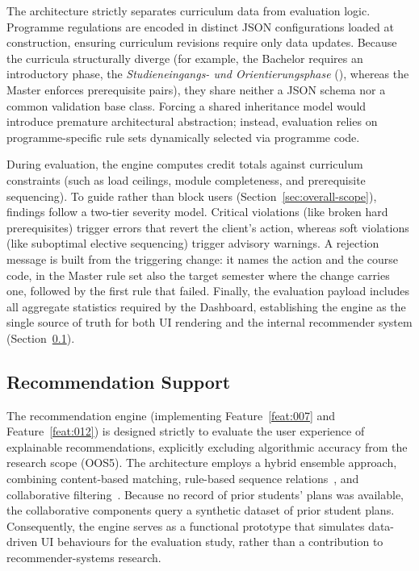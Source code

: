 The architecture strictly separates curriculum data from evaluation logic. Programme regulations are encoded in distinct JSON configurations loaded at construction, ensuring curriculum revisions require only data updates. Because the curricula structurally diverge (for example, the Bachelor requires an introductory phase, the \emph{Studieneingangs- und Orientierungsphase} (), whereas the Master enforces prerequisite pairs), they share neither a JSON schema nor a common validation base class. Forcing a shared inheritance model would introduce premature architectural abstraction; instead, evaluation relies on programme-specific rule sets dynamically selected via programme code.

During evaluation, the engine computes credit totals against curriculum constraints (such as load ceilings, module completeness, and prerequisite sequencing). To guide rather than block users (Section~\ref{sec:overall-scope}), findings follow a two-tier severity model. Critical violations (like broken hard prerequisites) trigger errors that revert the client's action, whereas soft violations (like suboptimal elective sequencing) trigger advisory warnings. A rejection message is built from the triggering change: it names the action and the course code, in the Master rule set also the target semester where the change carries one, followed by the first rule that failed. Finally, the evaluation payload includes all aggregate statistics required by the Dashboard, establishing the engine as the single source of truth for both UI rendering and the internal recommender system (Section~\ref{sec:impl-recommender}).

\subsection{Recommendation Support}
\label{sec:impl-recommender}

The recommendation engine (implementing Feature~\ref{feat:007} and Feature~\ref{feat:012}) is designed strictly to evaluate the user experience of explainable recommendations, explicitly excluding algorithmic accuracy from the research scope (OOS5). The architecture employs a hybrid ensemble approach, combining content-based matching, rule-based sequence relations~\cite{wong_sequence_2018}, and collaborative filtering~\cite{bhumichitr_recommender_2017}. Because no record of prior students' plans was available, the collaborative components query a synthetic dataset of prior student plans. Consequently, the engine serves as a functional prototype that simulates data-driven UI behaviours for the evaluation study, rather than a contribution to recommender-systems research.

